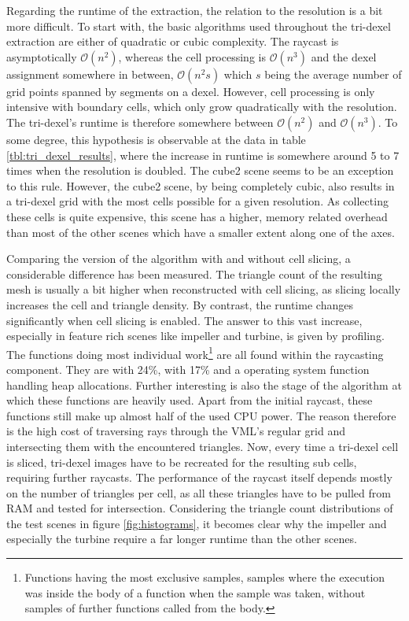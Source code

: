 Regarding the runtime of the extraction, the relation to the resolution is a bit more difficult.
To start with, the basic algorithms used throughout the tri-dexel extraction are either of quadratic or cubic complexity.
The raycast is asymptotically $\mathcal{O}(n^2)$, whereas the cell processing is $\mathcal{O}(n^3)$ and the dexel assignment somewhere in between, $\mathcal{O}(n^2s)$ which $s$ being the average number of grid points spanned by segments on a dexel.
However, cell processing is only intensive with boundary cells, which only grow quadratically with the resolution.
The tri-dexel's runtime is therefore somewhere between $\mathcal{O}(n^2)$ and $\mathcal{O}(n^3)$.
To some degree, this hypothesis is observable at the data in table \ref{tbl:tri_dexel_results}, where the increase in runtime is somewhere around 5 to 7 times when the resolution is doubled.
The cube2 scene seems to be an exception to this rule.
However, the cube2 scene, by being completely cubic, also results in a tri-dexel grid with the most cells possible for a given resolution.
As collecting these cells is quite expensive, this scene has a higher, memory related overhead than most of the other scenes which have a smaller extent along one of the axes.

Comparing the version of the algorithm with and without cell slicing, a considerable difference has been measured.
The triangle count of the resulting mesh is usually a bit higher when reconstructed with cell slicing, as slicing locally increases the cell and triangle density.
By contrast, the runtime changes significantly when cell slicing is enabled.
The answer to this vast increase, especially in feature rich scenes like impeller and turbine, is given by profiling.
The functions doing most individual work\footnote{
	Functions having the most exclusive samples, \ie samples where the execution was inside the body of a function when the sample was taken, without samples of further functions called from the body.}
are all found within the raycasting component.
They are  with 24\%,  with 17\% and a operating system function handling heap allocations.
Further interesting is also the stage of the algorithm at which these functions are heavily used.
Apart from the initial raycast, these functions still make up almost half of the used CPU power.
The reason therefore is the high cost of traversing rays through the VML's regular grid and intersecting them with the encountered triangles.
Now, every time a tri-dexel cell is sliced, tri-dexel images have to be recreated for the resulting sub cells, requiring further raycasts.
The performance of the raycast itself depends mostly on the number of triangles per cell, as all these triangles have to be pulled from RAM and tested for intersection.
Considering the triangle count distributions of the test scenes in figure \ref{fig:histograms}, it becomes clear why the impeller and especially the turbine require a far longer runtime than the other scenes.


